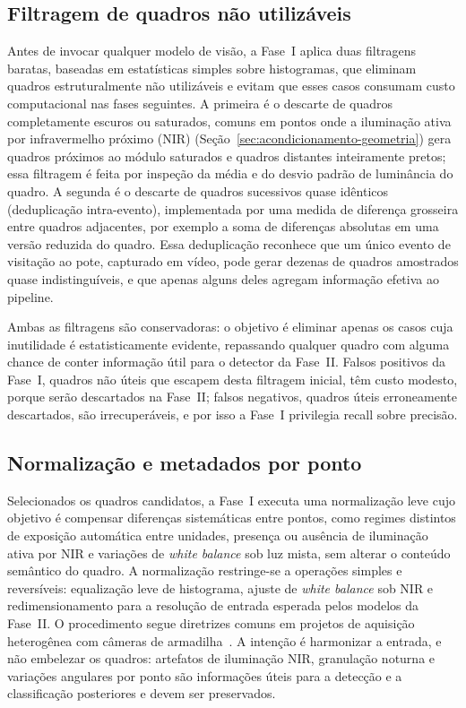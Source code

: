 \subsection*{Filtragem de quadros não utilizáveis}

Antes de invocar qualquer modelo de visão, a Fase~I aplica duas filtragens baratas, baseadas em estatísticas simples sobre histogramas, que eliminam quadros estruturalmente não utilizáveis e evitam que esses casos consumam custo computacional nas fases seguintes. A primeira é o descarte de quadros completamente escuros ou saturados, comuns em pontos onde a iluminação ativa por infravermelho próximo (NIR) (Seção~\ref{sec:acondicionamento-geometria}) gera quadros próximos ao módulo saturados e quadros distantes inteiramente pretos; essa filtragem é feita por inspeção da média e do desvio padrão de luminância do quadro. A segunda é o descarte de quadros sucessivos quase idênticos (deduplicação intra-evento), implementada por uma medida de diferença grosseira entre quadros adjacentes, por exemplo a soma de diferenças absolutas em uma versão reduzida do quadro. Essa deduplicação reconhece que um único evento de visitação ao pote, capturado em vídeo, pode gerar dezenas de quadros amostrados quase indistinguíveis, e que apenas alguns deles agregam informação efetiva ao pipeline.

Ambas as filtragens são conservadoras: o objetivo é eliminar apenas os casos cuja inutilidade é estatisticamente evidente, repassando qualquer quadro com alguma chance de conter informação útil para o detector da Fase~II. Falsos positivos da Fase~I, quadros não úteis que escapem desta filtragem inicial, têm custo modesto, porque serão descartados na Fase~II; falsos negativos, quadros úteis erroneamente descartados, são irrecuperáveis, e por isso a Fase~I privilegia recall sobre precisão.

\subsection*{Normalização e metadados por ponto}

Selecionados os quadros candidatos, a Fase~I executa uma normalização leve cujo objetivo é compensar diferenças sistemáticas entre pontos, como regimes distintos de exposição automática entre unidades, presença ou ausência de iluminação ativa por NIR e variações de \textit{white balance} sob luz mista, sem alterar o conteúdo semântico do quadro. A normalização restringe-se a operações simples e reversíveis: equalização leve de histograma, ajuste de \textit{white balance} sob NIR e redimensionamento para a resolução de entrada esperada pelos modelos da Fase~II. O procedimento segue diretrizes comuns em projetos de aquisição heterogênea com câmeras de armadilha~\cite{velez2022choosing,velasco2024smartcameratraps}. A intenção é harmonizar a entrada, e não embelezar os quadros: artefatos de iluminação NIR, granulação noturna e variações angulares por ponto são informações úteis para a detecção e a classificação posteriores e devem ser preservados.

